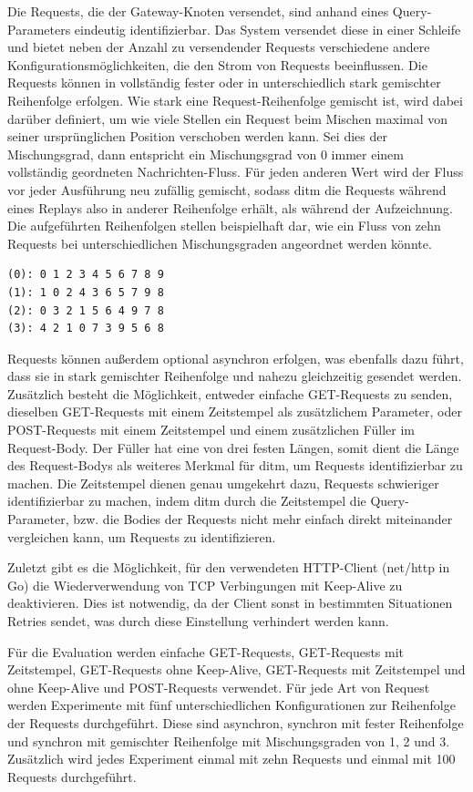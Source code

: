 \documentclass[12pt,a4paper]{report}
\begin{document}
Die Requests, die der Gateway-Knoten versendet, sind anhand eines Query-Parameters eindeutig identifizierbar. Das System versendet
diese in einer Schleife und bietet neben der Anzahl zu versendender Requests verschiedene andere Konfigurationsmöglichkeiten, die
den Strom von Requests beeinflussen. Die Requests können in vollständig fester oder in unterschiedlich stark gemischter
Reihenfolge erfolgen. Wie stark eine Request-Reihenfolge gemischt ist, wird dabei darüber definiert, um wie viele Stellen ein
Request beim Mischen maximal von seiner ursprünglichen Position verschoben werden kann. Sei dies der Mischungsgrad, dann
entspricht ein Mischungsgrad von 0 immer einem vollständig geordneten Nachrichten-Fluss. Für jeden anderen Wert wird der Fluss vor
jeder Ausführung neu zufällig gemischt, sodass ditm die Requests während eines Replays also in anderer Reihenfolge erhält, als
während der Aufzeichnung. Die aufgeführten Reihenfolgen stellen beispielhaft dar, wie ein Fluss von zehn Requests bei
unterschiedlichen Mischungsgraden angeordnet werden könnte.
\begin{verbatim}
(0): 0 1 2 3 4 5 6 7 8 9
(1): 1 0 2 4 3 6 5 7 9 8
(2): 0 3 2 1 5 6 4 9 7 8
(3): 4 2 1 0 7 3 9 5 6 8
\end{verbatim}
Requests können außerdem optional asynchron erfolgen, was ebenfalls dazu führt, dass sie in stark gemischter Reihenfolge und nahezu
gleichzeitig gesendet werden. Zusätzlich besteht die Möglichkeit, entweder einfache GET-Requests zu senden, dieselben GET-Requests
mit einem Zeitstempel als zusätzlichem Parameter, oder POST-Requests mit einem Zeitstempel und einem zusätzlichen Füller im
Request-Body. Der Füller hat eine von drei festen Längen, somit dient die Länge des Request-Bodys als weiteres Merkmal für ditm,
um Requests identifizierbar zu machen. Die Zeitstempel dienen genau umgekehrt dazu, Requests schwieriger identifizierbar zu
machen, indem ditm durch die Zeitstempel die Query-Parameter, bzw. die Bodies der Requests nicht mehr einfach direkt miteinander
vergleichen kann, um Requests zu identifizieren.

Zuletzt gibt es die Möglichkeit, für den verwendeten HTTP-Client (net/http in Go) die Wiederverwendung von TCP Verbingungen mit Keep-Alive
zu deaktivieren. Dies ist notwendig, da der Client sonst in bestimmten Situationen Retries sendet, was durch diese Einstellung
verhindert werden kann.

Für die Evaluation werden einfache GET-Requests, GET-Requests mit Zeitstempel, GET-Requests ohne Keep-Alive, GET-Requests mit
Zeitstempel und ohne Keep-Alive und POST-Requests verwendet. Für jede Art von Request werden Experimente mit fünf
unterschiedlichen Konfigurationen zur Reihenfolge der Requests durchgeführt. Diese sind asynchron, synchron mit fester Reihenfolge
und synchron mit gemischter Reihenfolge mit Mischungsgraden von 1, 2 und 3. Zusätzlich wird jedes Experiment einmal mit zehn
Requests und einmal mit 100 Requests durchgeführt.
\end{document}
